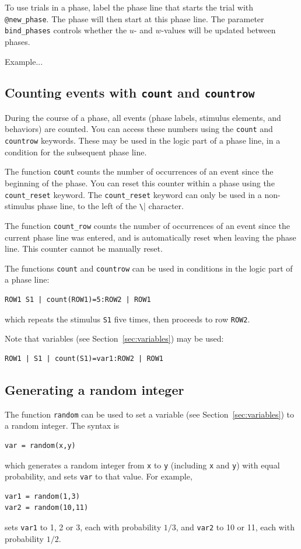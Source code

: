 \documentclass[11pt]{article}
\newcommand{\scr}[1]{\lstinline|#1|}
\begin{document}
To use trials in a phase, label the phase line that starts the trial with \scr{@new_phase}. The phase will then start at this phase line. The parameter \scr{bind_phases} controls whether the $u$- and $w$-values will be updated between phases.

Example...

\subsection{Counting events with \scr{count} and \scr{countrow}}
During the course of a phase, all events (phase labels, stimulus elements, and behaviors) are counted. You can access these numbers using the \scr{count} and \scr{countrow} keywords. These may be used in the logic part of a phase line, in a condition for the subsequent phase line.

The function \scr{count} counts the number of occurrences of an event since the beginning of the phase. You can reset this counter within a phase using the \scr{count_reset} keyword. The \scr{count_reset} keyword can only be used in a non-stimulus phase line, to the left of the \scr{\|} character.

The function \scr{count_row} counts the number of occurrences of an event since the current phase line was entered, and is automatically reset when leaving the phase line. This counter cannot be manually reset.

The functions \scr{count} and \scr{countrow} can be used in conditions in the logic part of a phase line:
\begin{verbatim}
ROW1 S1 | count(ROW1)=5:ROW2 | ROW1
\end{verbatim}
which repeats the stimulus \scr{S1} five times, then proceeds to row \scr{ROW2}.

Note that variables (see Section~\ref{sec:variables}) may be used:
\begin{verbatim}
ROW1 | S1 | count(S1)=var1:ROW2 | ROW1
\end{verbatim}

\subsection{Generating a random integer}
The function \scr{random} can be used to set a variable (see Section~\ref{sec:variables}) to a random integer. The syntax is
\begin{verbatim}
var = random(x,y)
\end{verbatim}
which generates a random integer from \scr{x} to \scr{y} (including \scr{x} and \scr{y}) with equal probability, and sets \scr{var} to that value. For example,
\begin{verbatim}
var1 = random(1,3)
var2 = random(10,11)
\end{verbatim}
sets \scr{var1} to 1, 2 or 3, each with probability $1/3$, and
\scr{var2} to 10 or 11, each with probability $1/2$.
\end{document}
